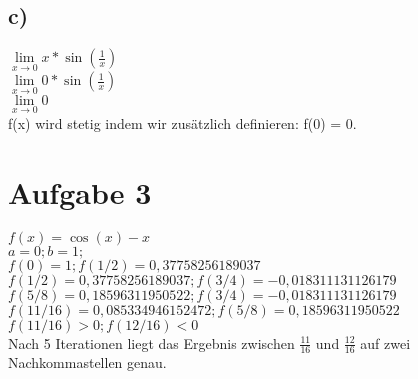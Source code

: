 \documentclass{article}
\begin{document}
	\subsection*{c)}
	$\lim\limits_{x \to 0} x * \sin(\frac{1}{x})$ \\
	$\lim\limits_{x \to 0} 0 * \sin(\frac{1}{x})$ \\
	$\lim\limits_{x \to 0} 0$ \\
	f(x) wird stetig indem wir zusätzlich definieren: f(0) = 0.
	\section*{Aufgabe 3}
	$f(x) = \cos(x) - x$ \\
	$a = 0; b = 1;$ \\
	$f(0) = 1; f(1/2) = 0,37758256189037 $ \\
	$f(1/2) = 0,37758256189037; f(3/4) = -0,018311131126179$ \\
	$f(5/8) = 0,18596311950522; f(3/4) = -0,018311131126179$ \\
	$f(11/16)= 0,085334946152472; f(5/8) = 0,18596311950522$ \\
	$f(11/16) > 0; f(12/16)<0$ \\
	Nach 5 Iterationen liegt das Ergebnis zwischen $\frac{11}{16}$ und $\frac{12}{16}$ auf zwei Nachkommastellen genau.
\end{document}
